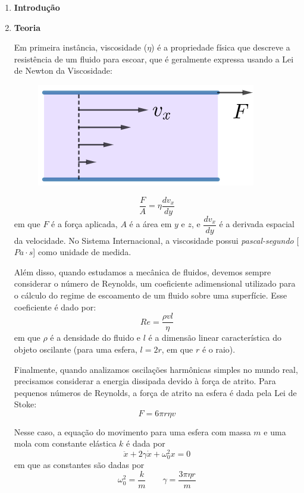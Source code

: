\documentclass[a4paper, 12pt]{article}
\begin{document}
	\begin{multicols}{2} \begin{enumerate}
		\item \textbf{Introdução}
			
		\item \textbf{Teoria}
			\setlength{\parindent}{4ex}
			\par Em primeira instância, viscosidade ($\eta$) é a propriedade física que descreve a resistência de um fluido para escoar, que é geralmente expressa usando a Lei de Newton da Viscosidade:
				\begin{figure}[H]
					\centering
					\includegraphics[scale=0.6]{./img/viscosidade.png}
				\end{figure}
				$$\frac{F}{A} = \eta \dfrac{dv_x}{dy}$$
				em que $F$ é a força aplicada, $A$ é a área em $y$ e $z$, e $\dfrac{dv_x}{dy}$ é a derivada espacial da velocidade. No Sistema Internacional, a viscosidade possui \textit{pascal-segundo} [$Pa \cdot s$] como unidade de medida.
				\par Além disso, quando estudamos a mecânica de fluidos, devemos sempre considerar o número de Reynolds, um coeficiente adimensional utilizado para o cálculo do regime de escoamento de um fluido sobre uma superfície. Esse coeficiente é dado por:
				$$Re = \frac{\rho v l}{\eta}$$
				em que $\rho$ é a densidade do fluido e $l$ é a dimensão linear característica do objeto oscilante (para uma esfera, $l = 2 r$, em que $r$ é o raio).
				\par Finalmente, quando analizamos oscilações harmônicas simples no mundo real, precisamos considerar a energia dissipada devido à força de atrito. Para pequenos números de Reynolds, a força de atrito na esfera é dada pela Lei de Stoke:
				$$F = 6 \pi r \eta v$$
				\par Nesse caso, a equação do movimento para uma esfera com massa $m$ e uma mola com constante elástica $k$ é dada por
				$$\ddot{x} + 2 \gamma \dot{x} + \omega_0^2 x = 0$$
				em que as constantes são dadas por
					$$\omega_0^2 = \frac{k}{m} \qquad \gamma = \frac{3 \pi \eta r}{m}$$

\end{enumerate}
\end{multicols}
\end{document}
